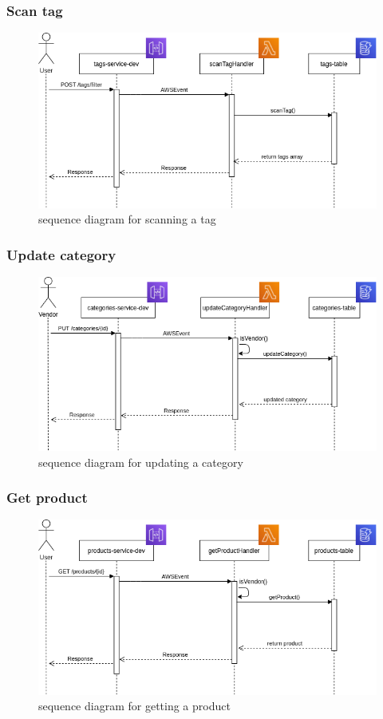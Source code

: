 \subsubsection{Scan tag}
\begin{figure}[!h]
    \vspace{5px}
    \includegraphics[scale=0.5]{../../../../Images/Diagrammi/maintainerManual/scanTagSequence.png}
    \centering
    \caption{sequence diagram for scanning a tag} 
\end{figure}
\pagebreak
\subsubsection{Update category}
\begin{figure}[!h]
    \vspace{5px}
    \includegraphics[scale=0.5]{../../../../Images/Diagrammi/maintainerManual/updateCategorySequence.png}
    \centering
    \caption{sequence diagram for updating a category} 
\end{figure}
\pagebreak
\subsubsection{Get product}
\begin{figure}[!h]
    \vspace{5px}
    \includegraphics[scale=0.5]{../../../../Images/Diagrammi/maintainerManual/getProductSequence.png}
    \centering
    \caption{sequence diagram for getting a product} 
\end{figure}